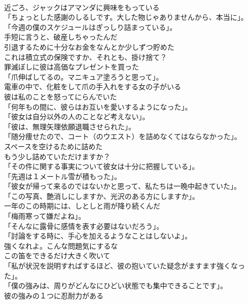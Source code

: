\documentclass[8pt]{extreport}
\begin{document}
\begin{CJK}{UTF8}{min}
\\	近ごろ、ジャックはアマンダに興味をもっている	
\\	「ちょっとした感謝のしるしです。大した物じゃありませんから、本当に」。	
\\	「今週の僕のスケジュールはぎっしり詰まっている」。	
\\	手短に言うと、破産しちゃったんだ	
\\	引退するために十分なお金をなんとか少しずつ貯めた	
\\	これは積立式の保険ですか、それとも、掛け捨て？	
\\	罪滅ぼしに彼は高価なプレゼントを買った	
\\	「爪伸ばしてるの。マニキュア塗ろうと思って」。	
\\	電車の中で、化粧をして爪の手入れをする女の子がいる	
\\	彼は私のことを怒ってにらんでいた	
\\	「何年もの間に、彼らはお互いを愛いするようになった」。	
\\	「彼女は自分以外の人のことなど考えない」。	
\\	「彼は、無理矢理依願退職させられた」。	
\\	「随分痩せたので、コート（のウエスト）を詰めなくてはならなかった」。	
\\	スペースを空けるために詰めた	
\\	もう少し詰めていただけますか？	
\\	「その件に関する事実について彼女は十分に把握している」。	
\\	「先週は１メートル雪が積もった」。	
\\	「彼女が帰って来るのではないかと思って、私たちは一晩中起きていた」。	
\\	「この写真、艶消しにしますか、光沢のある方にしますか」。	
\\	一年のこの時期には、しとしと雨が降り続くんだ	
\\	「梅雨寒って嫌だよね」。	
\\	「そんなに露骨に感情を表す必要はないだろう」。	
\\	「討論をする時に、手心を加えるようなことはしないよ」。	
\\	強くなれよ。こんな問題気にするな	
\\	この笛をできるだけ大きく吹いて	
\\	「私が状況を説明すればするほど、彼の抱いていた疑念がますます強くなった」。	
\\	「僕の強みは、周りがどんなにひどい状態でも集中できることです」。	
\\	彼の強みの１つに忍耐力がある	

\end{CJK}
\end{document}

